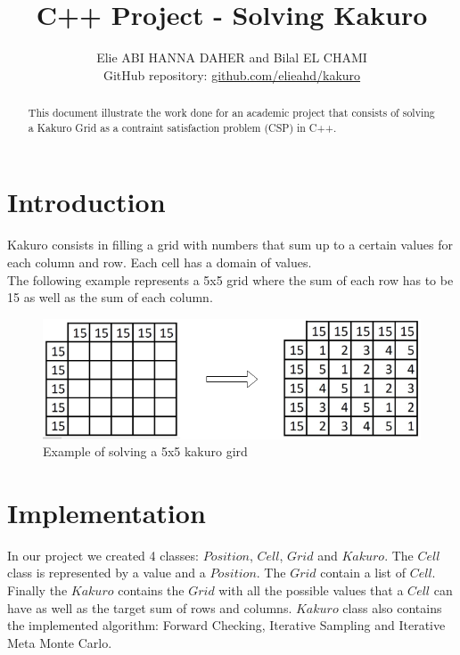 \documentclass[journal, a4paper]{IEEEtran}
\begin{document}
\title{C++ Project - Solving Kakuro}
\author{
    Elie ABI HANNA DAHER and Bilal EL CHAMI \\ 
    GitHub repository: \href{https://github.com/elieahd/kakuro}{github.com/elieahd/kakuro}
}
\maketitle
\begin{abstract}
    This document illustrate the work done for an academic project that consists of solving a Kakuro Grid as a contraint satisfaction problem (CSP) in C++.
\end{abstract}
\section{Introduction}
 Kakuro consists in filling a grid with numbers that sum up to a certain values for each column and row. Each cell has a domain of values.\\
 The following example represents a 5x5 grid where the sum of each row has to be 15 as well as the sum of each column.
\begin{figure}[h!]
         \begin{center}
        \includegraphics[width=\columnwidth]{example_kakuro.png}
        \caption{Example of solving a 5x5 kakuro gird}
        \label{fig:example_kakuro}
         \end{center}
\end{figure}
\section{Implementation}
In our project we created 4 classes: $Position$, $Cell$, $Grid$ and $Kakuro$.
The $Cell$ class is represented by a value and a $Position$. 
The $Grid$ contain a list of $Cell$. 
Finally the $Kakuro$ contains the $Grid$ with all the possible values that 
a $Cell$ can have as well as the target sum of rows and columns. 
$Kakuro$ class also contains the implemented algorithm: Forward Checking, 
Iterative Sampling and Iterative Meta Monte Carlo. \\
\end{document}
